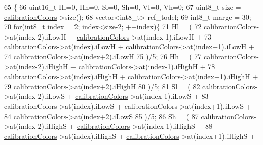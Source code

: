 \begin{DoxyCode}
65                          \{
66     uint16\_t Hl=0, Hh=0, Sl=0, Sh=0, Vl=0, Vh=0;
67     uint8\_t size = \hyperlink{classCalibration_a062b450b8f24d5eadab562b3ed929f89}{calibrationColors}->size();
68     vector<int8\_t> ref\_todel;
69     int8\_t marge = 30;
70     \textcolor{keywordflow}{for}(int8\_t index = 2; index<size-2; ++index)\{
71         Hl = (
72             \hyperlink{classCalibration_a062b450b8f24d5eadab562b3ed929f89}{calibrationColors}->at(index-2).iLowH + 
      \hyperlink{classCalibration_a062b450b8f24d5eadab562b3ed929f89}{calibrationColors}->at(index-1).iLowH + 
73             \hyperlink{classCalibration_a062b450b8f24d5eadab562b3ed929f89}{calibrationColors}->at(index).iLowH + 
      \hyperlink{classCalibration_a062b450b8f24d5eadab562b3ed929f89}{calibrationColors}->at(index+1).iLowH + 
74             \hyperlink{classCalibration_a062b450b8f24d5eadab562b3ed929f89}{calibrationColors}->at(index+2).iLowH
75         )/5;
76         Hh = (
77             \hyperlink{classCalibration_a062b450b8f24d5eadab562b3ed929f89}{calibrationColors}->at(index-2).iHighH + 
      \hyperlink{classCalibration_a062b450b8f24d5eadab562b3ed929f89}{calibrationColors}->at(index-1).iHighH + 
78             \hyperlink{classCalibration_a062b450b8f24d5eadab562b3ed929f89}{calibrationColors}->at(index).iHighH + 
      \hyperlink{classCalibration_a062b450b8f24d5eadab562b3ed929f89}{calibrationColors}->at(index+1).iHighH + 
79             \hyperlink{classCalibration_a062b450b8f24d5eadab562b3ed929f89}{calibrationColors}->at(index+2).iHighH
80         )/5;
81         Sl = (
82             \hyperlink{classCalibration_a062b450b8f24d5eadab562b3ed929f89}{calibrationColors}->at(index-2).iLowS + 
      \hyperlink{classCalibration_a062b450b8f24d5eadab562b3ed929f89}{calibrationColors}->at(index-1).iLowS + 
83             \hyperlink{classCalibration_a062b450b8f24d5eadab562b3ed929f89}{calibrationColors}->at(index).iLowS + 
      \hyperlink{classCalibration_a062b450b8f24d5eadab562b3ed929f89}{calibrationColors}->at(index+1).iLowS + 
84             \hyperlink{classCalibration_a062b450b8f24d5eadab562b3ed929f89}{calibrationColors}->at(index+2).iLowS
85         )/5;
86         Sh = (
87             \hyperlink{classCalibration_a062b450b8f24d5eadab562b3ed929f89}{calibrationColors}->at(index-2).iHighS + 
      \hyperlink{classCalibration_a062b450b8f24d5eadab562b3ed929f89}{calibrationColors}->at(index-1).iHighS + 
88             \hyperlink{classCalibration_a062b450b8f24d5eadab562b3ed929f89}{calibrationColors}->at(index).iHighS + 
      \hyperlink{classCalibration_a062b450b8f24d5eadab562b3ed929f89}{calibrationColors}->at(index+1).iHighS + 

\end{DoxyCode}
